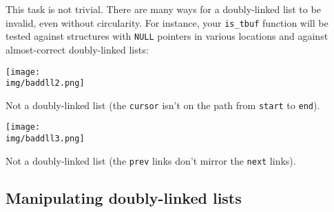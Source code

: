\documentclass[12pt]{exam}
\begin{document}
This task is not trivial. There are many ways for a doubly-linked list
to be invalid, even without circularity. For instance, your
\lstinline'is_tbuf' function will be tested against structures with
\lstinline'NULL' pointers in various locations and against almost-correct
doubly-linked lists:

\bigskip

\enlargethispage{1ex}
\noindent
\begin{minipage}{0.55\linewidth}\centering
  \texttt{[image: \\img/baddll2.png]}
\end{minipage}\hspace{1em}
\begin{minipage}{0.35\linewidth}
  Not a doubly-linked list (the \lstinline'cursor' isn't on the path from
  \lstinline'start' to \lstinline'end').
\end{minipage}
\hfill

\vfill

\noindent
\begin{minipage}{0.55\linewidth}\centering
  \texttt{[image: \\img/baddll3.png]}
\end{minipage}\hspace{1em}
\begin{minipage}{0.35\linewidth}
  Not a doubly-linked list (the \lstinline'prev' links don't mirror the
  \lstinline'next' links).
\end{minipage}
\hfill

\clearpage
\subsection{Manipulating doubly-linked lists}
\end{document}
